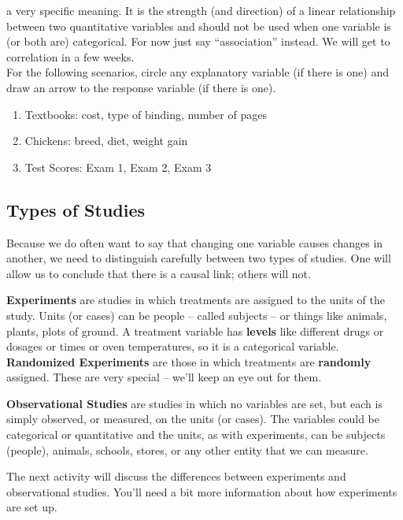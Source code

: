   a very specific meaning. It is the strength (and direction) of a
  linear relationship between two quantitative variables and should
  not be used when one variable is (or both are) categorical.  For now
  just say ``association'' instead. We will get to correlation in a
  few weeks.\\
For the following scenarios, circle any explanatory variable (if there
is one) and draw an arrow to the response variable (if there is
one). %
\begin{enumerate}
\item Textbooks:  cost, type of binding, number of pages\\
\item Chickens:  breed, diet,  weight gain\\
\item Test Scores:  Exam 1, Exam 2, Exam 3\\
\end{enumerate}


\subsection{ Types of Studies}

  Because we do often want to say that changing one variable causes
  changes in another, we need to distinguish carefully between two
  types of studies. One will allow us to conclude that there is a causal
  link;   others will not.

  {\bf Experiments} are studies in which treatments are assigned to
  the units of the study. Units (or cases) can be people -- called
  subjects -- or things like animals, plants, plots of ground.  A
  treatment variable has {\bf levels} like different drugs or dosages
  or times or oven temperatures, so it is a categorical variable. \\
  {\bf Randomized Experiments} are those in which treatments are {\bf
    randomly} assigned.  These are very special -- we'll keep an eye
  out for them.


  {\bf Observational Studies} are studies in which no variables are
  set, but each is simply observed, or measured, on the units (or
  cases). The variables could be categorical or quantitative and the
  units, as with experiments, can be subjects (people), animals,
  schools, stores, or any other entity that we can measure. 

  The next activity will discuss the differences between experiments
  and observational studies.  You'll need a bit more information about
  how experiments are set up.

